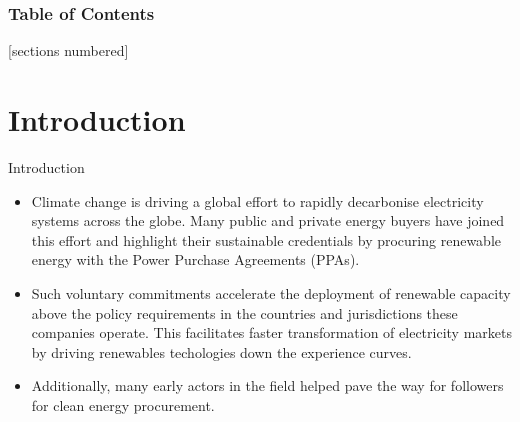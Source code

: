 \begin{frame}

  \frametitle{Table of Contents}
  [sections numbered]
  \tableofcontents[hideallsubsections]
\end{frame}



\section{Introduction}


\begin{frame}{Introduction}

  \centering
    \begin{itemize}
    \item Climate change is driving a global effort to rapidly decarbonise 
    electricity systems across the globe. 
    Many public and private energy buyers have joined this effort and highlight
    their sustainable credentials by procuring renewable energy with the 
    Power Purchase Agreements (PPAs).
    \item Such \alert{voluntary commitments accelerate the deployment of renewable 
    capacity} above the policy requirements in the countries and jurisdictions
    these companies operate. This facilitates faster
    transformation of electricity markets by driving renewables
    techologies down the experience curves.
    \item Additionally, many early actors in the field helped pave the way for followers 
     for clean energy procurement.
    \end{itemize}
  
\end{frame}


